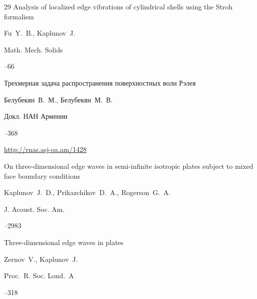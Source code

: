 \begin{thebibliography}{29}
\paper Analysis of localized edge vibrations of cylindrical shells using the Stroh formalism

\by Fu~Y.~B., Kaplunov~J.

\jour Math. Mech. Solids




–66





\paper Трехмерная задача распространения поверхностных волн Рэлея

\by  Белубекян~В.~М., Белубекян~М.~В.

\jour Докл. НАН Армении




--368

\elink \url{http://rnas.asj-oa.am/1428}




\paper On three-dimensional edge waves in semi-infinite isotropic plates subject to mixed face boundary conditions

\by Kaplunov~J.~D., Prikazchikov~D.~A., Rogerson~G.~A.

\jour J. Acoust. Soc. Am.




–2983





\paper Three-dimensional edge waves in plates

\by Zernov~V., Kaplunov~J.

\jour Proc.~R. Soc. Lond.~A



--318






\end{thebibliography}
